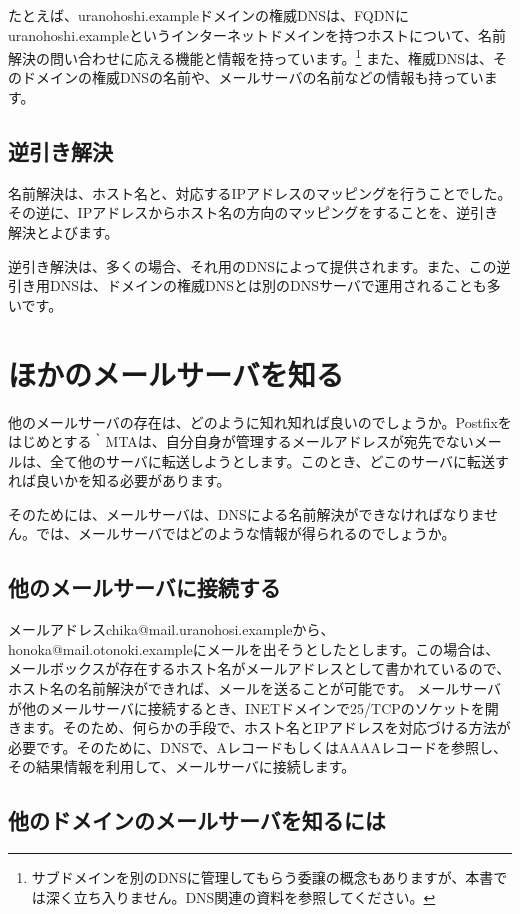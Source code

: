 たとえば、uranohoshi.exampleドメインの権威DNSは、FQDNにuranohoshi.exampleというインターネットドメインを持つホストについて、名前解決の問い合わせに応える機能と情報を持っています。\footnote{サブドメインを別のDNSに管理してもらう委譲の概念もありますが、本書では深く立ち入りません。DNS関連の資料を参照してください。}
また、権威DNSは、そのドメインの権威DNSの名前や、メールサーバの名前などの情報も持っています。

\subsection{逆引き解決}
名前解決は、ホスト名と、対応するIPアドレスのマッピングを行うことでした。その逆に、IPアドレスからホスト名の方向のマッピングをすることを、逆引き解決とよびます。

逆引き解決は、多くの場合、それ用のDNSによって提供されます。また、この逆引き用DNSは、ドメインの権威DNSとは別のDNSサーバで運用されることも多いです。

\section{ほかのメールサーバを知る}

他のメールサーバの存在は、どのように知れ知れば良いのでしょうか。Postfixをはじめとする｀MTAは、自分自身が管理するメールアドレスが宛先でないメールは、全て他のサーバに転送しようとします。このとき、どこのサーバに転送すれば良いかを知る必要があります。

そのためには、メールサーバは、DNSによる名前解決ができなければなりません。では、メールサーバではどのような情報が得られるのでしょうか。

\subsection{他のメールサーバに接続する}
メールアドレスchika@mail.uranohosi.exampleから、honoka@mail.otonoki.exampleにメールを出そうとしたとします。この場合は、メールボックスが存在するホスト名がメールアドレスとして書かれているので、ホスト名の名前解決ができれば、メールを送ることが可能です。
メールサーバが他のメールサーバに接続するとき、INETドメインで25/TCPのソケットを開きます。そのため、何らかの手段で、ホスト名とIPアドレスを対応づける方法が必要です。そのために、DNSで、AレコードもしくはAAAAレコードを参照し、その結果情報を利用して、メールサーバに接続します。

\subsection{他のドメインのメールサーバを知るには}

